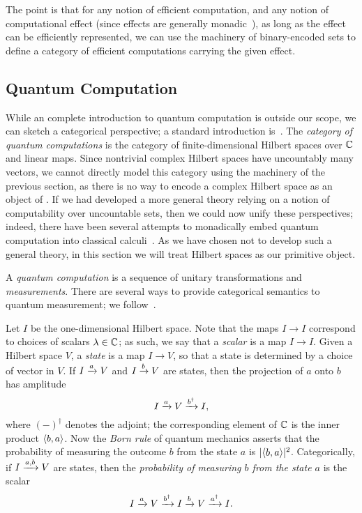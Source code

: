 The point is that for any notion of efficient computation, and any notion of
computational effect (since effects are generally
monadic~\cite{wadler-thiemann-2003}), as long as the effect can be efficiently
represented, we can use the machinery of binary-encoded sets to define a
category of efficient computations carrying the given effect.

\subsection{Quantum Computation}

While an complete introduction to quantum computation is outside our scope, we
can sketch a categorical perspective; a standard introduction
is~\cite{nielsen-chuang-2010}. The \emph{category of quantum computations}
 is the category of finite-dimensional Hilbert spaces over $\mathbb{C}$ and
linear maps. Since nontrivial complex Hilbert spaces have
uncountably many vectors, we cannot directly model this category using the
machinery of the previous section, as there is no way to encode a complex
Hilbert space as an object of . If we had developed a more general
theory relying on a notion of computability over uncountable sets, then we could
now unify these perspectives; indeed, there have been several attempts to
monadically embed quantum computation into classical
calculi~\cite{altenrich-green-2009,abramsky-2017}. As we have chosen not to
develop such a general theory, in this section we will treat Hilbert spaces as
our primitive object.

A \emph{quantum computation} is a sequence of unitary transformations and
\emph{measurements}. There are several ways to provide categorical semantics to
quantum measurement; we follow~\cite{heunen-vicary-2014}.

Let $I$ be the one-dimensional Hilbert space. Note that the maps $I\to I$
correspond to choices of scalars $\lambda\in\mathbb{C}$; as such, we say that a
\emph{scalar} is a map $I\to I$. Given a Hilbert space $V$, a \emph{state} is a
map $I\to V$, so that a state is determined by a choice of vector in $V$. If
$I\xrightarrow{a} V$ and $I\xrightarrow{b} V$ are states, then the projection of $a$ onto $b$
has amplitude \[
  I\xrightarrow{a}V\xrightarrow{b^\dag} I,
\]where $(-)^\dag$ denotes the adjoint; the corresponding element of $\mathbb{C}$ is
the inner product $\langle b,a\rangle$. Now the \emph{Born rule} of quantum mechanics
asserts that the probability of measuring the outcome $b$ from the state $a$ is
$|\langle b, a\rangle|^2$. Categorically, if $I\xrightarrow{a,b} V$ are states, then the
\emph{probability of measuring $b$ from the state $a$} is the scalar \[
    I\xrightarrow{a}V\xrightarrow{b^\dag} I\xrightarrow{b} V\xrightarrow{a^\dag} I.
  \]

